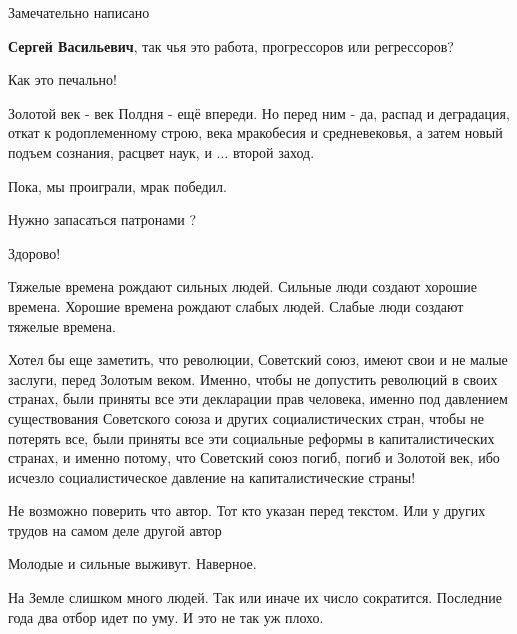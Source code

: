 \begin{itemize}
Замечательно написано

\textbf{Сергей Васильевич}, так чья это работа, прогрессоров или регрессоров?

Как это печально!


Золотой век - век Полдня - ещё впереди. Но перед ним - да, распад и деградация,
откат к родоплеменному строю, века мракобесия и средневековья, а затем новый
подъем сознания, расцвет наук, и ... второй заход.

Пока, мы проиграли, мрак победил.

Нужно запасаться патронами ?

Здорово!


\obeycr
Тяжелые времена рождают сильных людей.
Сильные люди создают хорошие времена.
Хорошие времена рождают слабых людей.
Слабые люди создают тяжелые времена.
\restorecr



Хотел бы еще заметить, что революции, Советский союз, имеют свои и не малые
заслуги, перед Золотым веком. Именно, чтобы не допустить революций в своих
странах, были приняты все эти декларации прав человека, именно под давлением
существования Советского союза и других социалистических стран, чтобы не
потерять все, были приняты все эти социальные реформы в капиталистических
странах, и именно потому, что Советский союз погиб, погиб и Золотой век, ибо
исчезло социалистическое давление на капиталистические страны!


Не возможно поверить что автор. Тот кто указан перед текстом. Или у других
трудов на самом деле другой автор


Молодые и сильные выживут. Наверное.


На Земле слишком много людей.  Так или иначе их число сократится.  Последние
года два отбор идет по уму. И это не так уж плохо.


\end{itemize} %
